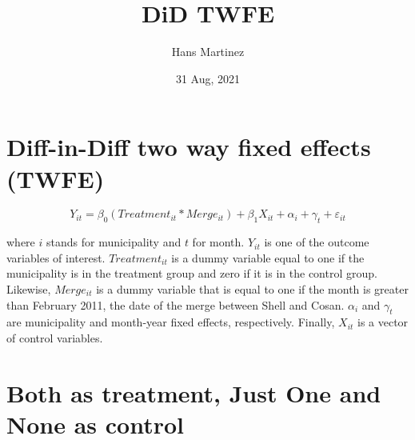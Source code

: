 \documentclass[
]{article}
\title{DiD TWFE}
\author{Hans Martinez}
\date{31 Aug, 2021}
\begin{document}
\maketitle

\hypertarget{diff-in-diff-two-way-fixed-effects-twfe}{%
\section{Diff-in-Diff two way fixed effects
(TWFE)}\label{diff-in-diff-two-way-fixed-effects-twfe}}

\begin{equation}
  Y_{it}=\beta_{0}(Treatment_{it}*Merge_{it}) + \beta_1 X_{it} + \alpha_{i} + \gamma_{t}  + \varepsilon_{it}
\end{equation}

where \(i\) stands for municipality and \(t\) for month. \(Y_{it}\) is
one of the outcome variables of interest. \(Treatment_{it}\) is a dummy
variable equal to one if the municipality is in the treatment group and
zero if it is in the control group. Likewise, \(Merge_{it}\) is a dummy
variable that is equal to one if the month is greater than February
2011, the date of the merge between Shell and Cosan. \(\alpha_i\) and
\(\gamma_t\) are municipality and month-year fixed effects,
respectively. Finally, \(X_{it}\) is a vector of control variables.

\hypertarget{both-as-treatment-just-one-and-none-as-control}{%
\section{Both as treatment, Just One and None as
control}\label{both-as-treatment-just-one-and-none-as-control}}
\end{document}
